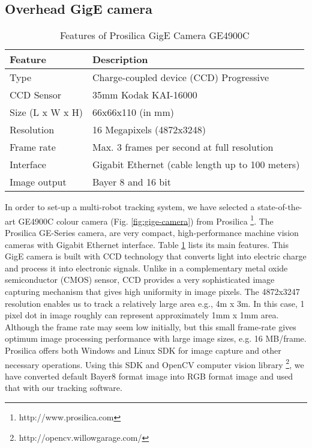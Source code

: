 \subsection{Overhead GigE camera}
\begin{table}
\caption{Features of Prosilica GigE Camera GE4900C}
\label{table:ge4900c}
\begin{center}
\begin{tabular}{|l||l|}
\hline \textbf{Feature} & \textbf{Description}\\
\hline Type & Charge-coupled device (CCD) Progressive\\
\hline CCD Sensor & 35mm Kodak KAI-16000\\
\hline Size (L x W x H) & 66x66x110 (in mm)\\
\hline Resolution & 16 Megapixels (4872x3248)\\ 
\hline Frame rate & Max. 3 frames per second at full resolution\\
\hline Interface & Gigabit Ethernet (cable length up to 100 meters)\\
\hline Image output & Bayer 8 and 16 bit\\
\hline
\end{tabular}
\end{center}
\end{table}
In order to set-up a multi-robot tracking system, we have selected a state-of-the-art GE4900C colour camera (Fig. \ref{fig:gige-camera}) from Prosilica \footnote{http://www.prosilica.com}. The Prosilica GE-Series camera, are very compact, high-performance machine vision cameras with Gigabit Ethernet interface.  Table \ref{table:ge4900c} lists its main features. This GigE camera is built with CCD technology that converts light into electric charge and process it into electronic signals. Unlike in a complementary metal oxide semiconductor (CMOS) sensor, CCD provides a very sophisticated image capturing mechanism that gives high uniformity in image pixels. The 4872x3247 resolution enables us to track a relatively large area e.g., 4m x 3m. In this case, 1 pixel dot in image roughly can represent approximately 1mm x 1mm area. Although the frame rate may seem low initially, but this small frame-rate gives optimum image processing performance with large image sizes, e.g. 16 MB/frame. Prosilica offers both Windows and Linux SDK for image capture and other necessary operations. Using this SDK and OpenCV computer vision library \footnote{http://opencv.willowgarage.com/}, we have converted default Bayer8 format image into RGB format image and used that with our tracking software.
